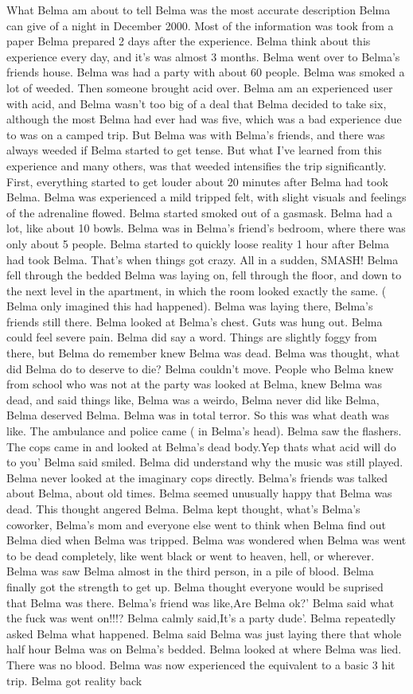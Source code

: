 \documentclass[12pt]{book}
\begin{document}
What Belma am about to tell Belma was the most accurate description Belma can give of a night in December 2000. Most of the information was took from a paper Belma prepared 2 days after the experience. Belma think about this experience every day, and it's was almost 3 months. Belma went over to Belma's friends house. Belma was had a party with about 60 people. Belma was smoked a lot of weeded. Then someone brought acid over. Belma am an experienced user with acid, and Belma wasn't too big of a deal that Belma decided to take six, although the most Belma had ever had was five, which was a bad experience due to was on a camped trip. But Belma was with Belma's friends, and there was always weeded if Belma started to get tense. But what I've learned from this experience and many others, was that weeded intensifies the trip significantly. First, everything started to get louder about 20 minutes after Belma had took Belma. Belma was experienced a mild tripped felt, with slight visuals and feelings of the adrenaline flowed. Belma started smoked out of a gasmask. Belma had a lot, like about 10 bowls. Belma was in Belma's friend's bedroom, where there was only about 5 people. Belma started to quickly loose reality 1 hour after Belma had took Belma. That's when things got crazy. All in a sudden, SMASH! Belma fell through the bedded Belma was laying on, fell through the floor, and down to the next level in the apartment, in which the room looked exactly the same. ( Belma only imagined this had happened). Belma was laying there, Belma's friends still there. Belma looked at Belma's chest. Guts was hung out. Belma could feel severe pain. Belma did say a word. Things are slightly foggy from there, but Belma do remember knew Belma was dead. Belma was thought, what did Belma do to deserve to die? Belma couldn't move. People who Belma knew from school who was not at the party was looked at Belma, knew Belma was dead, and said things like, Belma was a weirdo, Belma never did like Belma, Belma deserved Belma. Belma was in total terror. So this was what death was like. The ambulance and police came ( in Belma's head). Belma saw the flashers. The cops came in and looked at Belma's dead body.Yep thats what acid will do to you' Belma said smiled. Belma did understand why the music was still played. Belma never looked at the imaginary cops directly. Belma's friends was talked about Belma, about old times. Belma seemed unusually happy that Belma was dead. This thought angered Belma. Belma kept thought, what's Belma's coworker, Belma's mom and everyone else went to think when Belma find out Belma died when Belma was tripped. Belma was wondered when Belma was went to be dead completely, like went black or went to heaven, hell, or wherever. Belma was saw Belma almost in the third person, in a pile of blood. Belma finally got the strength to get up. Belma thought everyone would be suprised that Belma was there. Belma's friend was like,Are Belma ok?' Belma said what the fuck was went on!!!? Belma calmly said,It's a party dude'. Belma repeatedly asked Belma what happened. Belma said Belma was just laying there that whole half hour Belma was on Belma's bedded. Belma looked at where Belma was lied. There was no blood. Belma was now experienced the equivalent to a basic 3 hit trip. Belma got reality back 
\end{document}
